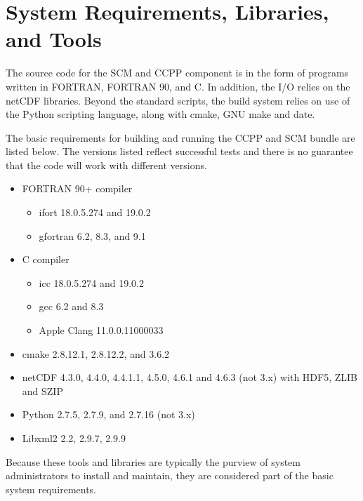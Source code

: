\section{System Requirements, Libraries, and Tools}
\label{section: systemrequirements}

The source code for the SCM and CCPP component is in the form of programs written in FORTRAN, FORTRAN 90, and C. In addition, the I/O relies on the netCDF libraries. Beyond the standard scripts, the build system relies on use of the Python scripting language, along with cmake, GNU make and date.

The basic requirements for building and running the CCPP and SCM bundle are listed below. The versions listed reflect successful tests and there is no guarantee that the code will work with different versions.
\begin{itemize}
    \item FORTRAN 90+ compiler
    	\begin{itemize}
   	 \item ifort 18.0.5.274 and 19.0.2
	 \item gfortran 6.2, 8.3, and 9.1
	 \end{itemize}
    \item C compiler
    	\begin{itemize}
	\item icc 18.0.5.274 and 19.0.2
	\item gcc 6.2 and 8.3
	\item Apple Clang 11.0.0.11000033
	\end{itemize}
    \item cmake 2.8.12.1, 2.8.12.2, and 3.6.2
    \item netCDF 4.3.0, 4.4.0, 4.4.1.1, 4.5.0, 4.6.1 and 4.6.3 (not 3.x) with HDF5, ZLIB and SZIP
    \item Python 2.7.5, 2.7.9, and 2.7.16 (not 3.x)
    \item Libxml2 2.2, 2.9.7, 2.9.9
\end{itemize}

Because these tools and libraries are typically the purview of system administrators to install and maintain, they are considered  part of the basic system requirements.

